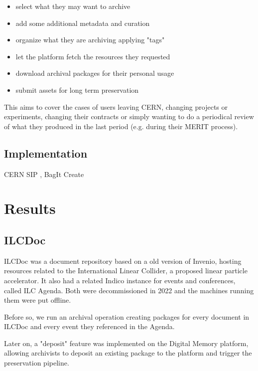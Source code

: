 \documentclass[11pt]{IEEEtran}
\begin{document}
\begin{itemize}
    \item select what they may want to archive 
    \item add some additional metadata and curation
    \item organize what they are archiving applying "tags"
    \item let the platform fetch the resources they requested 
    \item download archival packages for their personal usage
    \item submit assets for long term preservation
\end{itemize}

This aims to cover the cases of users leaving CERN, changing projects or experiments, changing their contracts or simply wanting to do a periodical review of what they produced in the last period (e.g. during their MERIT process).

\subsection{Implementation}

CERN SIP \cite{CERNDigitalMemorySIPSpecGitLab-2021-09-15}, BagIt Create \cite{CERNDigitalMemorybagitcreateGitLab-2023-02-17}

\section{Results}


\subsection{ILCDoc}

ILCDoc was a document repository based on a old version of Invenio, hosting resources related to the International Linear Collider, a proposed linear particle accelerator. It also had a related Indico instance for events and conferences, called ILC Agenda.
Both were decommissioned in 2022 and the machines running them were put offline.

Before so, we run an archival operation creating packages for every document in ILCDoc and every event they referenced in the Agenda.

Later on, a "deposit" feature was implemented on the Digital Memory platform, allowing archivists to deposit an existing package to the platform and trigger the preservation pipeline.
\end{document}

